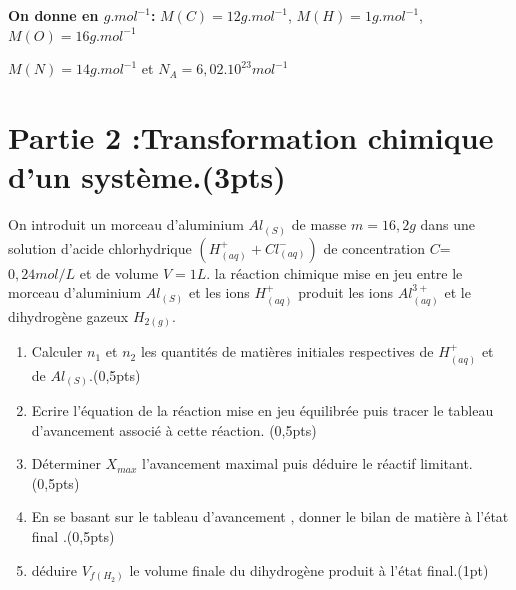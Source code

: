 \documentclass[12pt]{article}
\begin{document}
\textbf{On donne en $g.mol^{-1}$:  }  $M(C)=12g.mol^{-1}$, $M(H)=1g.mol^{-1}$, $M(O)=16 g.mol^{-1}$ 

$M(N)=14 g.mol^{-1}$ et $N_A=6,02.10^{23}mol^{-1}$





\section*{Partie 2 :Transformation chimique d’un système.\dotfill (3pts) }
On introduit un morceau d’aluminium $Al_{(S)}$ de masse $m=16,2g$ dans une solution d’acide chlorhydrique $(H^+_{(aq)}+Cl^-_{(aq)})$ de concentration   $C$=$0,24 mol/L$ et de volume $V=1L$. la réaction chimique mise en jeu entre le morceau d’aluminium $Al_{(S)}$ et les ions $H^+_{(aq)}$ produit les ions $Al^{3+}_{(aq)}$ et le dihydrogène gazeux $H_{2(g)}$.

\begin{enumerate}
	\item  Calculer $n_1$ et $n_2$ les quantités de matières initiales respectives de $H^+_{(aq)}$ et de $Al_{(S)}$.\dotfill (0,5pts)

	\item  Ecrire l’équation de la réaction mise en jeu équilibrée puis tracer le tableau d’avancement associé à cette
réaction. \dotfill (0,5pts)
\item  Déterminer $X_{max}$ l’avancement maximal puis déduire le réactif limitant. \dotfill(0,5pts)
\item  En se basant sur le tableau d’avancement , donner le bilan de matière à l’état final .\dotfill(0,5pts)
\item  déduire $V_{f(H_2)}$ le volume finale du dihydrogène produit à l’état final.\dotfill(1pt)
\end{enumerate}
\end{document}
